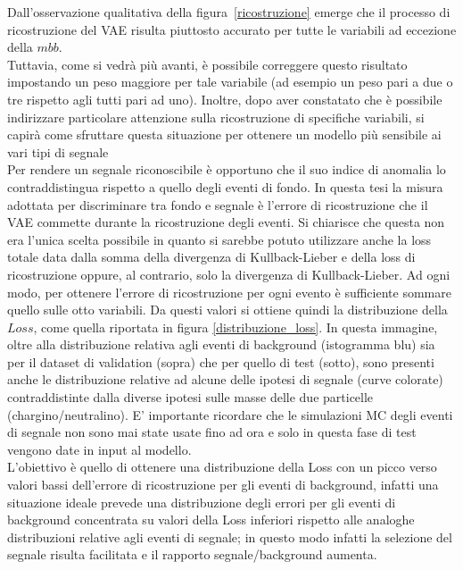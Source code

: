 Dall'osservazione qualitativa della figura~\ref{ricostruzione} emerge che il processo di ricostruzione del VAE risulta piuttosto accurato per tutte le variabili ad eccezione della $\textit{mbb}$. \\
Tuttavia, come si vedrà più avanti, è possibile correggere questo risultato impostando un peso maggiore per tale variabile (ad esempio un peso pari a due o tre rispetto agli tutti pari ad uno). Inoltre, dopo aver constatato che è possibile indirizzare particolare attenzione sulla ricostruzione di specifiche variabili, si capirà come sfruttare questa situazione per ottenere un modello più sensibile ai vari tipi di segnale\\
Per rendere un segnale riconoscibile è opportuno che il suo indice di anomalia lo contraddistingua rispetto a quello degli eventi di fondo. In questa tesi la misura adottata per discriminare tra fondo e segnale è l'errore di ricostruzione che il VAE commette durante la ricostruzione degli eventi. Si chiarisce che questa non era l'unica scelta possibile in quanto si sarebbe potuto utilizzare anche la loss totale data dalla somma della divergenza di Kullback-Lieber e della loss di ricostruzione oppure, al contrario, solo la divergenza di Kullback-Lieber. 
Ad ogni modo, per ottenere l'errore di ricostruzione per ogni evento è sufficiente sommare quello sulle otto variabili. Da questi valori si ottiene quindi la distribuzione della $\textit{Loss}$, come quella riportata in figura \ref{distribuzione_loss}. In questa immagine, oltre alla distribuzione relativa agli eventi di background (istogramma blu) sia per il dataset di validation (sopra) che per quello di test (sotto), sono presenti anche le distribuzione relative ad alcune delle ipotesi di segnale (curve colorate) contraddistinte dalla diverse ipotesi sulle masse delle due particelle (chargino/neutralino). E' importante ricordare che le simulazioni MC degli eventi di segnale non sono mai state usate fino ad ora e solo in questa fase di test vengono date in input al modello. \\
L'obiettivo è quello di ottenere una distribuzione della Loss con un picco verso valori bassi dell'errore di ricostruzione per gli eventi di background, infatti una situazione ideale prevede una distribuzione degli errori per gli eventi di background concentrata su valori della Loss inferiori rispetto alle analoghe distribuzioni relative agli eventi di segnale; in questo modo infatti la selezione del segnale risulta facilitata e il rapporto segnale/background aumenta.
